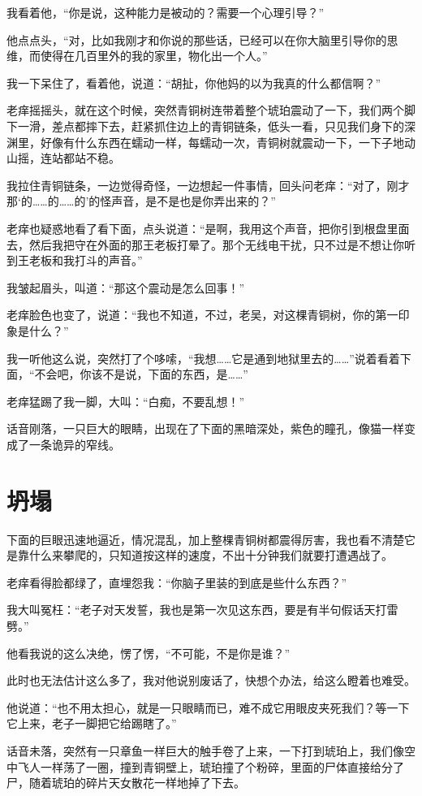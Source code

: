 我看着他，“你是说，这种能力是被动的？需要一个心理引导？”

他点点头，“对，比如我刚才和你说的那些话，已经可以在你大脑里引导你的思维，而使得在几百里外的我的家里，物化出一个人。”

我一下呆住了，看着他，说道：“胡扯，你他妈的以为我真的什么都信啊？”

老痒摇摇头，就在这个时候，突然青铜树连带着整个琥珀震动了一下，我们两个脚下一滑，差点都摔下去，赶紧抓住边上的青铜链条，低头一看，只见我们身下的深渊里，好像有什么东西在蠕动一样，每蠕动一次，青铜树就震动一下，一下子地动山摇，连站都站不稳。

我拉住青铜链条，一边觉得奇怪，一边想起一件事情，回头问老痒：“对了，刚才那‘的……的……的’的怪声音，是不是也是你弄出来的？”

老痒也疑惑地看了看下面，点头说道：“是啊，我用这个声音，把你引到根盘里面去，然后我把守在外面的那王老板打晕了。那个无线电干扰，只不过是不想让你听到王老板和我打斗的声音。”

我皱起眉头，叫道：“那这个震动是怎么回事！”

老痒脸色也变了，说道：“我也不知道，不过，老吴，对这棵青铜树，你的第一印象是什么？”

我一听他这么说，突然打了个哆嗦，“我想……它是通到地狱里去的……”说着看着下面，“不会吧，你该不是说，下面的东西，是……”

老痒猛踢了我一脚，大叫：“白痴，不要乱想！”

话音刚落，一只巨大的眼睛，出现在了下面的黑暗深处，紫色的瞳孔，像猫一样变成了一条诡异的窄线。

\chapter{坍塌}

下面的巨眼迅速地逼近，情况混乱，加上整棵青铜树都震得厉害，我也看不清楚它是靠什么来攀爬的，只知道按这样的速度，不出十分钟我们就要打遭遇战了。

老痒看得脸都绿了，直埋怨我：“你脑子里装的到底是些什么东西？”

我大叫冤枉：“老子对天发誓，我也是第一次见这东西，要是有半句假话天打雷劈。”

他看我说的这么决绝，愣了愣，“不可能，不是你是谁？”

此时也无法估计这么多了，我对他说别废话了，快想个办法，给这么瞪着也难受。

他说道：“也不用太担心，就是一只眼睛而已，难不成它用眼皮夹死我们？等一下它上来，老子一脚把它给踢瞎了。”

话音未落，突然有一只章鱼一样巨大的触手卷了上来，一下打到琥珀上，我们像空中飞人一样荡了一圈，撞到青铜壁上，琥珀撞了个粉碎，里面的尸体直接给分了尸，随着琥珀的碎片天女散花一样地掉了下去。

